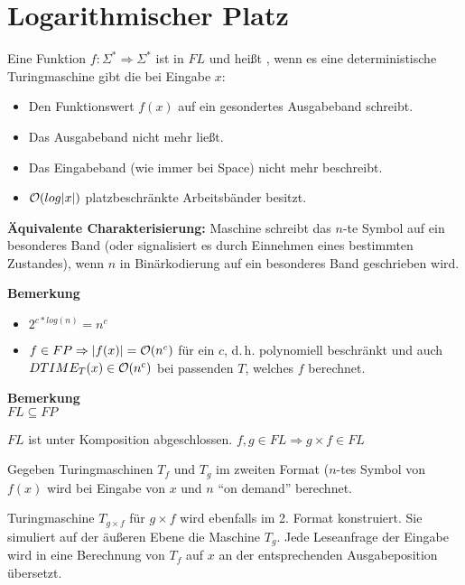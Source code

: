 

\section{Logarithmischer Platz}


Eine Funktion $f: \Sigma^\ast \Rightarrow \Sigma^\ast$ ist in $FL$ und
heißt , wenn es eine
deterministische Turingmaschine gibt die bei Eingabe $x$:

\begin{itemize}
\item Den Funktionswert $f(x)$ auf ein gesondertes Ausgabeband schreibt.
\item Das Ausgabeband nicht mehr ließt.
\item Das Eingabeband (wie immer
bei Space) nicht mehr beschreibt.
\item $\mathcal{O}(log|x|)$ platzbeschränkte Arbeitsbänder besitzt.
\end{itemize}

\textbf{Äquivalente Charakterisierung:}
Maschine schreibt das $n$-te Symbol auf
ein besonderes Band (oder signalisiert es durch Einnehmen eines
bestimmten Zustandes), wenn $n$ in Binärkodierung auf ein besonderes
Band geschrieben wird.

\textbf{Bemerkung}\\
\begin{itemize}
\item $2^{c*log(n)}=n^c$
\item $f \in FP \Rightarrow |f(x)| = \mathcal{O}(n^c)$
für ein $c$, d.\,h. polynomiell beschränkt und auch $DTIME_T(x) \in \mathcal{O}(n^c)$
bei passenden $T$, welches $f$ berechnet.
\end{itemize}

\textbf{Bemerkung}\\ 
$FL \subseteq FP$
\begin{satz}
    $FL$ ist unter Komposition abgeschlossen.
    $f,g \in FL \Rightarrow g \times f \in FL$
\end{satz}

Gegeben Turingmaschinen $T_f$ und $T_g$ im zweiten Format ($n$-tes Symbol von
$f(x)$ wird bei Eingabe von $x$ und $n$ ``on demand'' berechnet.

Turingmaschine $T_{g \times f}$ für $g \times f $ wird ebenfalls im
2. Format konstruiert. Sie simuliert auf der äußeren Ebene die
Maschine $T_g$.  Jede Leseanfrage der Eingabe wird in eine Berechnung
von $T_f$ auf $x$ an der entsprechenden Ausgabeposition übersetzt.





